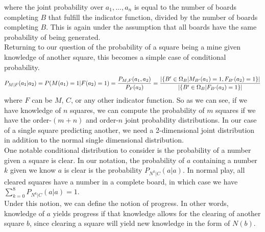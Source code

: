 where the joint probability over $a_1,\dots,a_n$ is equal to the number of boards completing $B$ that fulfill the indicator function, divided by the number of boards completing $B$. This is again under the assumption that all boards have the same probability of being generated.\\

Returning to our question of the probability of a square being a mine given knowledge of another square, this becomes a simple case of conditional probability.
\begin{align*}\index{Probability!conditional}
    P_{M|F}(a_1|a_2)=P(M(a_1)=1|F(a_2)=1)=\frac{P_{M,F}(a_1,a_2)}{P_F(a_2)}=\frac{|\{B'\in\Omega_B|M_{B'}(a_1)=1,F_{B'}(a_2)=1\}|}{|\{B'\in\Omega_B|F_{B'}(a_2)=1\}|}
\end{align*}
where $F$ can be $M$, $C$, or any other indicator function. So as we can see, if we have knowledge of $n$ squares, we can compute the probability of $m$ squares if we have the order-$(m+n)$ and order-$n$ joint probability distributions. In our case of a single square predicting another, we need a 2-dimensional joint distribution in addition to the normal single dimensional distribution.\\

One notable conditional distribution to consider is the probability of a number given a square is clear. In our notation, the probability of $a$ containing a number $k$ given we know $a$ is clear is the probability $P_{N^k|C}(a|a)$. In normal play, all cleared squares have a number in a complete board, in which case we have $\sum_{k=0}^8P_{N^k|C}(a|a)=1$.\\

Under this notion, we can define the notion of progress.
In other words, knowledge of $a$ yields progress if that knowledge allows for the clearing of another square $b$, since clearing a square will yield new knowledge in the form of $N(b)$.\\

\iffalse
We can further extend this notion of progress to the expected amount of progress given knowledge of a square.

\thm{First Order Expected Progress Given a Clear Square}{
Let $G_{A,F}=|\{b:P_{M|F}(b|A)=0\}|$ The first order expected progress of a board $B$ given square $a$ is clear is given by
\begin{align*}
    G_1(a)=\sum_{k=0}^8P_{N^k}(a)G_{a,N^k}
\end{align*}
}
\fi